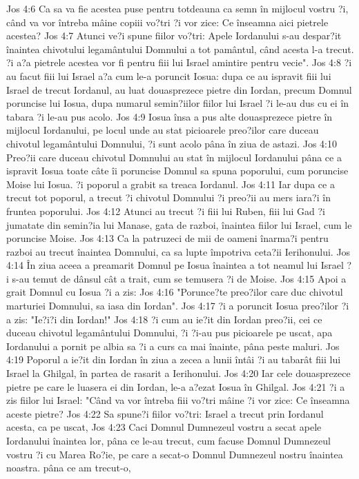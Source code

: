 Jos 4:6  Ca sa va fie acestea puse pentru totdeauna ca semn în mijlocul vostru ?i, când va vor întreba mâine copiii vo?tri ?i vor zice: Ce înseamna aici pietrele acestea?
Jos 4:7  Atunci ve?i spune fiilor vo?tri: Apele Iordanului s-au despar?it înaintea chivotului legamântului Domnului a tot pamântul, când acesta l-a trecut. ?i a?a pietrele acestea vor fi pentru fiii lui Israel amintire pentru vecie".
Jos 4:8  ?i au facut fiii lui Israel a?a cum le-a poruncit Iosua: dupa ce au ispravit fiii lui Israel de trecut Iordanul, au luat douasprezece pietre din Iordan, precum Domnul poruncise lui Iosua, dupa numarul semin?iilor fiilor lui Israel ?i le-au dus cu ei în tabara ?i le-au pus acolo.
Jos 4:9  Iosua însa a pus alte douasprezece pietre în mijlocul Iordanului, pe locul unde au stat picioarele preo?ilor care duceau chivotul legamântului Domnului, ?i sunt acolo pâna în ziua de astazi.
Jos 4:10  Preo?ii care duceau chivotul Domnului au stat în mijlocul Iordanului pâna ce a ispravit Iosua toate câte îi poruncise Domnul sa spuna poporului, cum poruncise Moise lui Iosua. ?i poporul a grabit sa treaca Iordanul.
Jos 4:11  Iar dupa ce a trecut tot poporul, a trecut ?i chivotul Domnului ?i preo?ii au mers iara?i în fruntea poporului.
Jos 4:12  Atunci au trecut ?i fiii lui Ruben, fiii lui Gad ?i jumatate din semin?ia lui Manase, gata de razboi, înaintea fiilor lui Israel, cum le poruncise Moise.
Jos 4:13  Ca la patruzeci de mii de oameni înarma?i pentru razboi au trecut înaintea Domnului, ca sa lupte împotriva ceta?ii Ierihonului.
Jos 4:14  În ziua aceea a preamarit Domnul pe Iosua înaintea a tot neamul lui Israel ?i s-au temut de dânsul cât a trait, cum se temusera ?i de Moise.
Jos 4:15  Apoi a grait Domnul cu Iosua ?i a zis:
Jos 4:16  "Porunce?te preo?ilor care duc chivotul marturiei Domnului, sa iasa din Iordan".
Jos 4:17  ?i a poruncit Iosua preo?ilor ?i a zis: "Ie?i?i din Iordan!"
Jos 4:18  ?i cum au ie?it din Iordan preo?ii, cei ce duceau chivotul legamântului Domnului, ?i ?i-au pus picioarele pe uscat, apa Iordanului a pornit pe albia sa ?i a curs ca mai înainte, pâna peste maluri.
Jos 4:19  Poporul a ie?it din Iordan în ziua a zecea a lunii întâi ?i au tabarât fiii lui Israel la Ghilgal, în partea de rasarit a Ierihonului.
Jos 4:20  Iar cele douasprezece pietre pe care le luasera ei din Iordan, le-a a?ezat Iosua în Ghilgal.
Jos 4:21  ?i a zis fiilor lui Israel: "Când va vor întreba fiii vo?tri mâine ?i vor zice: Ce înseamna aceste pietre?
Jos 4:22  Sa spune?i fiilor vo?tri: Israel a trecut prin Iordanul acesta, ca pe uscat,
Jos 4:23  Caci Domnul Dumnezeul vostru a secat apele Iordanului înaintea lor, pâna ce le-au trecut, cum facuse Domnul Dumnezeul vostru ?i cu Marea Ro?ie, pe care a secat-o Domnul Dumnezeul nostru înaintea noastra. pâna ce am trecut-o,
